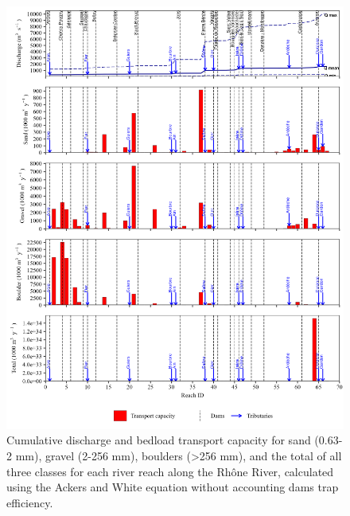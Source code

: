 \documentclass[
]{book}
\begin{document}
\begin{figure}
\includegraphics[width=26.24in]{img/res_cascade/res_E2_eA&W/plots_tr_cap-silt/tr_cap_res_sum_hy_E2_eA&W} \caption{Cumulative discharge and bedload transport capacity for sand (0.63-2 mm), gravel (2-256 mm), boulders (>256 mm), and the total of all three classes for each river reach along the Rhône River, calculated using the Ackers and White equation without accounting dams trap efficiency.}\label{fig:TrcE2eA}
\end{figure}
\end{document}
